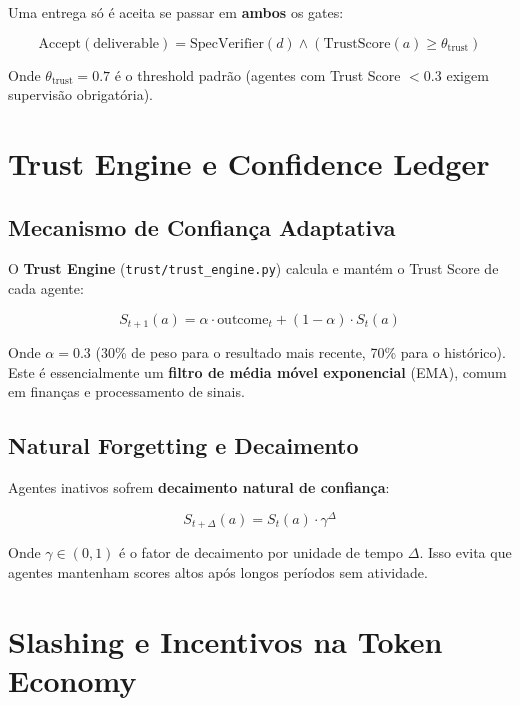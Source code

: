 Uma entrega só é aceita se passar em \textbf{ambos} os gates:

\begin{equation}
\text{Accept}(\text{deliverable}) = \text{SpecVerifier}(d) \land (\text{TrustScore}(a) \geq \theta_{\text{trust}})
\label{eq:double_gate}
\end{equation}

Onde $\theta_{\text{trust}} = 0.7$ é o threshold padrão (agentes com Trust Score $< 0.3$ exigem supervisão obrigatória).

\section{Trust Engine e Confidence Ledger}

\subsection{Mecanismo de Confiança Adaptativa}

O \textbf{Trust Engine} (\texttt{trust/trust\_engine.py}) calcula e mantém o Trust Score de cada agente:

\begin{equation}
S_{t+1}(a) = \alpha \cdot \text{outcome}_t + (1-\alpha) \cdot S_t(a)
\label{eq:trust_ema}
\end{equation}

Onde $\alpha = 0.3$ (30\% de peso para o resultado mais recente, 70\% para o histórico). Este é essencialmente um \textbf{filtro de média móvel exponencial} (EMA), comum em finanças e processamento de sinais.

\subsection{Natural Forgetting e Decaimento}

Agentes inativos sofrem \textbf{decaimento natural de confiança}:

\begin{equation}
S_{t+\Delta}(a) = S_t(a) \cdot \gamma^{\Delta}
\label{eq:trust_decay}
\end{equation}

Onde $\gamma \in (0, 1)$ é o fator de decaimento por unidade de tempo $\Delta$. Isso evita que agentes mantenham scores altos após longos períodos sem atividade.

\section{Slashing e Incentivos na Token Economy}

